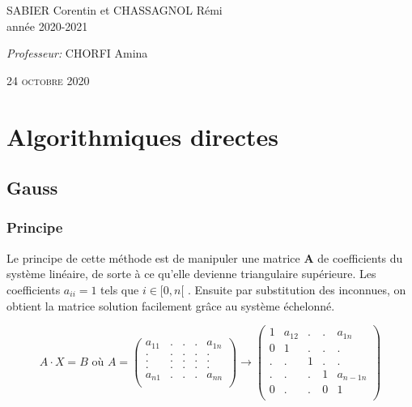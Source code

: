 \documentclass[a4paper]{article}
\begin{document}
\begin{titlepage}
\begin{center}
    \begin{minipage}{0.9\textwidth}
      \begin{flushleft} \large
        SABIER Corentin et CHASSAGNOL Rémi\\
        année 2020-2021\\[2cm]
      \end{flushleft}
    \end{minipage}

    \begin{minipage}{0.9\textwidth}
      \begin{flushright} \large
        \emph{Professeur:} CHORFI Amina\\
      \end{flushright}
    \end{minipage}

    \textsc{24 octobre 2020}

  \end{center}
\end{titlepage}

\clearpage

\tableofcontents

\clearpage

\section{Algorithmiques directes}

\subsection{Gauss}

\subsubsection{Principe}

Le principe de cette méthode est de manipuler une matrice \textbf{A} de coefficients du système linéaire, de sorte à ce qu'elle devienne triangulaire supérieure. Les coefficients $a_{ii} = 1$ tels que $i \in [0,n[$ . Ensuite par substitution des inconnues, on obtient la matrice solution facilement grâce au système échelonné.

\[
A \cdot X = B \text{  où  } A = \begin{pmatrix} 
a_{11} & .  & . & . & a_{1n}\\ 
.      & .  & . & . & . \\ 
.      & .  & . & . & . \\ 
.      & .  & . & . & . \\
a_{n1} & .  & . & . & a_{nn} \\  
\end{pmatrix}
\longrightarrow
\begin{pmatrix} 
1      & a_{12}  & . & . & a_{1n}\\ 
0      & 1  	 & . & . & . \\ 
.      & .  	 & 1 & . & . \\ 
.      & .   	 & . & 1 & a_{n-1n} \\
0      & .  	 & . & 0 & 1 \\  
\end{pmatrix}
\]
\end{document}
